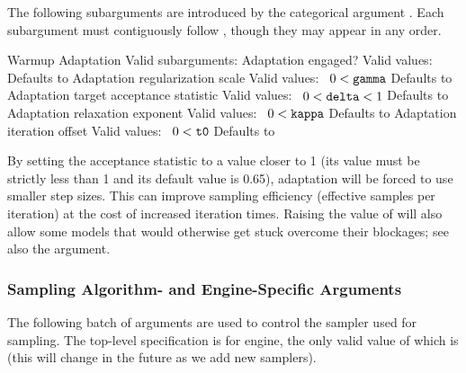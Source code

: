 The following subarguments are introduced by the categorical argument
.  Each subargument must contiguously follow ,
though they may appear in any order.  

\begin{description}
      {Warmup Adaptation}
      {Valid subarguments: }
%
        {Adaptation engaged?}
        {Valid values: \ }
        {Defaults to }
%
        {Adaptation regularization scale}
        {Valid values: \  $0 < \mbox{\code{gamma}}$}
        {Defaults to }
%
        {Adaptation target acceptance statistic}
        {Valid values: \  $0 < \mbox{\code{delta}} < 1$}
        {Defaults to }
%
        {Adaptation relaxation exponent}
        {Valid values: \  $0 < \mbox{\tt kappa}$}
        {Defaults to }
%
        {Adaptation iteration offset}
        {Valid values: \  $0 < \mbox{\code{t0}}$}
        {Defaults to }
%
\end{description}
%
By setting the acceptance statistic  to a value closer to
1 (its value must be strictly less than 1 and its default value is
0.65), adaptation will be forced to use smaller step sizes.  This can
improve sampling efficiency (effective samples per iteration) at the
cost of increased iteration times.  Raising the value of 
will also allow some models that would otherwise get stuck overcome
their blockages; see also the  argument.

\subsubsection{Sampling Algorithm- and Engine-Specific Arguments}

The following batch of arguments are used to control the sampler used
for sampling.  The top-level specification is for engine, the only
valid value of which is  (this will change in the future as
we add new samplers).  

